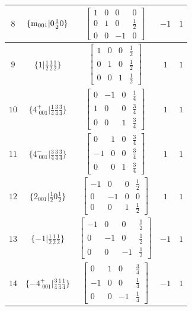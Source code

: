 \documentclass[fleqn,8pt]{jsarticle}
\begin{document}
\begin{longtable}{ccccc}
$ 8 $ & $ \{{\rm m}_{001}|0 \frac{1}{2} 0\} $ & $ \begin{bmatrix} 1 & 0 & 0 & 0 \\ 0 & 1 & 0 & \frac{1}{2} \\ 0 & 0 & -1 & 0 \end{bmatrix} $ & $ -1 $ & $ 1 $ \\ \hline
$ 9 $ & $ \{1|\frac{1}{2} \frac{1}{2} \frac{1}{2}\} $ & $ \begin{bmatrix} 1 & 0 & 0 & \frac{1}{2} \\ 0 & 1 & 0 & \frac{1}{2} \\ 0 & 0 & 1 & \frac{1}{2} \end{bmatrix} $ & $ 1 $ & $ 1 $ \\ \hline
$ 10 $ & $ \{4^{+}_{\,\,001}|\frac{1}{4} \frac{3}{4} \frac{3}{4}\} $ & $ \begin{bmatrix} 0 & -1 & 0 & \frac{1}{4} \\ 1 & 0 & 0 & \frac{3}{4} \\ 0 & 0 & 1 & \frac{3}{4} \end{bmatrix} $ & $ 1 $ & $ 1 $ \\ \hline
$ 11 $ & $ \{4^{-}_{\,\,001}|\frac{3}{4} \frac{3}{4} \frac{3}{4}\} $ & $ \begin{bmatrix} 0 & 1 & 0 & \frac{3}{4} \\ -1 & 0 & 0 & \frac{3}{4} \\ 0 & 0 & 1 & \frac{3}{4} \end{bmatrix} $ & $ 1 $ & $ 1 $ \\ \hline
$ 12 $ & $ \{2{}_{001}|\frac{1}{2} 0 \frac{1}{2}\} $ & $ \begin{bmatrix} -1 & 0 & 0 & \frac{1}{2} \\ 0 & -1 & 0 & 0 \\ 0 & 0 & 1 & \frac{1}{2} \end{bmatrix} $ & $ 1 $ & $ 1 $ \\ \hline
$ 13 $ & $ \{-1|\frac{1}{2} \frac{1}{2} \frac{1}{2}\} $ & $ \begin{bmatrix} -1 & 0 & 0 & \frac{1}{2} \\ 0 & -1 & 0 & \frac{1}{2} \\ 0 & 0 & -1 & \frac{1}{2} \end{bmatrix} $ & $ -1 $ & $ 1 $ \\ \hline
$ 14 $ & $ \{-4^{+}_{\,\,001}|\frac{3}{4} \frac{1}{4} \frac{1}{4}\} $ & $ \begin{bmatrix} 0 & 1 & 0 & \frac{3}{4} \\ -1 & 0 & 0 & \frac{1}{4} \\ 0 & 0 & -1 & \frac{1}{4} \end{bmatrix} $ & $ -1 $ & $ 1 $ \\ \hline

\end{longtable}
\end{document}
